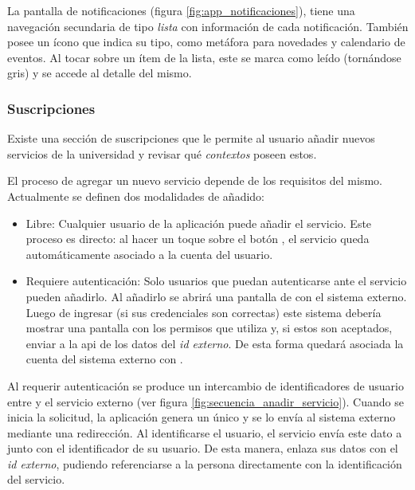 
La pantalla de notificaciones (figura \ref{fig:app_notificaciones}), tiene una navegación secundaria de tipo \textit{lista} con información de cada notificación. También posee un ícono que indica su tipo, como metáfora para novedades y calendario de eventos. Al tocar sobre un ítem de la lista, este se marca como leído (tornándose gris) y se accede al detalle del mismo.

\subsubsection{Suscripciones}
\label{funcionalidad_suscripciones}

Existe una sección de suscripciones que le permite al usuario añadir nuevos servicios de la universidad y revisar qué \textit{contextos} poseen estos.

El proceso de agregar un nuevo servicio depende de los requisitos del mismo. Actualmente se definen dos modalidades de añadido:
\begin{itemize}
\item Libre: Cualquier usuario de la aplicación puede añadir el servicio. Este proceso es directo: al hacer un toque sobre el botón , el servicio queda automáticamente asociado a la cuenta del usuario.
\item Requiere autenticación: Solo usuarios que puedan autenticarse ante el servicio pueden añadirlo. Al añadirlo se abrirá una pantalla de  con el sistema externo. Luego de ingresar (si sus credenciales son correctas) este sistema debería mostrar una pantalla con los permisos que utiliza y, si estos son aceptados, enviar a la \gls{api} de \nombreApp{} los datos del \textit{id externo}. De esta forma quedará asociada la cuenta del sistema externo con \nombreApp{}. 
\end{itemize}

Al requerir autenticación se produce un intercambio de identificadores de usuario entre \nombreApp{} y el servicio externo (ver figura \ref{fig:secuencia_anadir_servicio}). Cuando se inicia la solicitud, la aplicación genera un  único y se lo envía al sistema externo mediante una redirección. Al identificarse el usuario, el servicio envía este dato a \nombreApp{} junto con el identificador de su usuario. De esta manera, \nombreApp{} enlaza sus datos con el \textit{id externo}, pudiendo referenciarse a la persona directamente con la identificación del servicio. 

